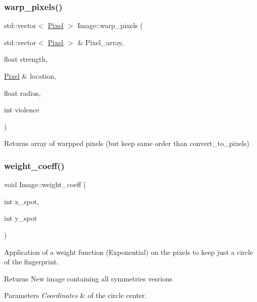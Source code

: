 \subsubsection{\texorpdfstring{warp\+\_\+pixels()}{warp\_pixels()}}
{\footnotesize\ttfamily std\+::vector$<$ \hyperlink{class_pixel}{Pixel} $>$ Image\+::warp\+\_\+pixels (\begin{DoxyParamCaption}\item[{std\+::vector$<$ \hyperlink{class_pixel}{Pixel} $>$ \&}]{Pixel\+\_\+array,  }\item[{float}]{strength,  }\item[{\hyperlink{class_pixel}{Pixel} \&}]{location,  }\item[{float}]{radius,  }\item[{int}]{violence }\end{DoxyParamCaption})}

Returns array of warpped pixels (but keep same order than convert\+\_\+to\+\_\+pixels) \mbox{\label{class_image_ae7249beaa8c989f37888ec3b2c444166}} 
\subsubsection{\texorpdfstring{weight\+\_\+coeff()}{weight\_coeff()}}
{\footnotesize\ttfamily void Image\+::weight\+\_\+coeff (\begin{DoxyParamCaption}\item[{int}]{x\+\_\+spot,  }\item[{int}]{y\+\_\+spot }\end{DoxyParamCaption})}



Application of a weight function (Exponential) on the pixels to keep just a circle of the fingerprint. 

\begin{DoxyReturn}{Returns}
New image containing all symmetries vesrions
\end{DoxyReturn}

\begin{DoxyParams}{Parameters}
{\em Coordinates} & of the circle center. \\
\hline
\end{DoxyParams}
\mbox{\label{class_image_a8d5d7d07ddaf59d0875b94e538f8429e}} 
